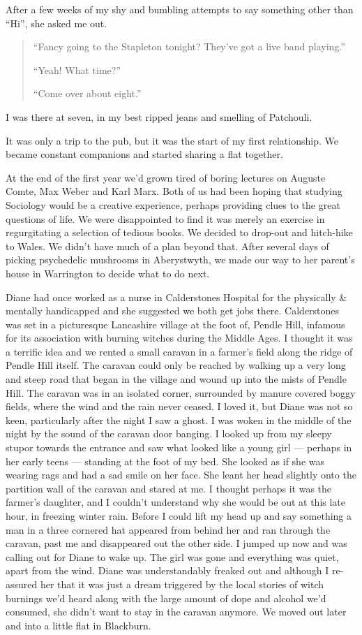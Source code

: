 \documentclass[12pt]{memoir}
\begin{document}
After a few weeks of my shy and bumbling attempts
to say something other than “Hi”, she asked me out.

\begin{quote}
“Fancy going to the Stapleton tonight? They’ve got a live band playing.”

“Yeah! What time?”

“Come over about eight.”
\end{quote}

I was there at seven, in my best ripped jeans and smelling of Patchouli.

It was only a trip to the pub, but it was the start of my first relationship.
We became constant companions and started sharing a flat together.

At the end of the first year we’d grown tired of boring lectures
on Auguste Comte, Max Weber and Karl Marx.
Both of us had been hoping that studying Sociology
would be a creative experience,
perhaps providing clues to the great questions of life.
We were disappointed to find it was merely an exercise
in regurgitating a selection of tedious books.
We decided to drop-out and hitch-hike to Wales.
We didn’t have much of a plan beyond that.
After several days of picking psychedelic mushrooms in Aberystwyth,
we made our way to her parent’s house in Warrington to decide what to do next.

Diane had once worked as a nurse in Calderstones Hospital
for the physically \& mentally handicapped
and she suggested we both get jobs there.
Calderstones was set in a picturesque Lancashire village at the foot of,
Pendle Hill, infamous for its association
with burning witches during the Middle Ages.
I thought it was a terrific idea and we rented a small caravan
in a farmer’s field along the ridge of Pendle Hill itself.
The caravan could only be reached by walking up a very long and steep road
that began in the village and wound up into the mists of Pendle Hill.
The caravan was in an isolated corner,
surrounded by manure covered boggy fields,
where the wind and the rain never ceased.
I loved it, but Diane was not so keen,
particularly after the night I saw a ghost.
I was woken in the middle of the night
by the sound of the caravan door banging.
I looked up from my sleepy stupor towards the entrance
and saw what looked like a young girl — perhaps in her early teens —
standing at the foot of my bed.
She looked as if she was wearing rags and had a sad smile on her face.
She leant her head slightly onto the partition wall of the caravan
and stared at me.
I thought perhaps it was the farmer’s daughter,
and I couldn’t understand why she would be out at this late hour,
in freezing winter rain.
Before I could lift my head up and say something a man in a three cornered hat
appeared from behind her and ran through the caravan,
past me and disappeared out the other side.
I jumped up now and was calling out for Diane to wake up.
The girl was gone and everything was quiet, apart from the wind.
Diane was understandably freaked out and although I re-assured her
that it was just a dream triggered by the local stories of witch burnings
we’d heard along with the large amount of dope and alcohol we’d consumed,
she didn’t want to stay in the caravan anymore.
We moved out later and into a little flat in Blackburn.
\end{document}

